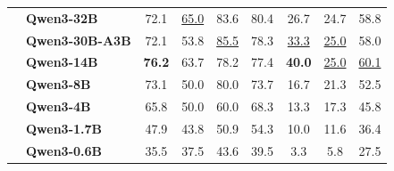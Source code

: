 \documentclass[dvipsnames]{article}
\begin{document}
\begin{table}[tbp]
{\begin{tabular}{clccccccc}
 & \textbf{Qwen3-32B} & 72.1 & \underline{65.0} & 83.6 & 80.4 & 26.7 & 24.7 & 58.8 \\
 & \textbf{Qwen3-30B-A3B} & 72.1 & 53.8 & \underline{85.5} & 78.3 & \underline{33.3} & \underline{25.0} & 58.0 \\
 & \textbf{Qwen3-14B} & \textbf{76.2} & 63.7 & 78.2 & 77.4 & \textbf{40.0} & \underline{25.0} & \underline{60.1} \\
 & \textbf{Qwen3-8B} & 73.1 & 50.0 & 80.0 & 73.7 & 16.7 & 21.3 & 52.5 \\
 & \textbf{Qwen3-4B} & 65.8 & 50.0 & 60.0 & 68.3 & 13.3 & 17.3 & 45.8 \\
 & \textbf{Qwen3-1.7B} & 47.9 & 43.8 & 50.9 & 54.3 & 10.0 & 11.6 & 36.4 \\
 & \textbf{Qwen3-0.6B} & 35.5 & 37.5 & 43.6 & 39.5 & 3.3 & 5.8 & 27.5 \\
\bottomrule
\end{tabular}
}
\end{table}
\end{document}
